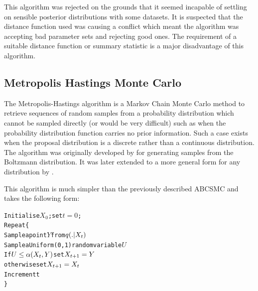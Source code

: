 
This algorithm was rejected on the grounds that it seemed incapable of settling on sensible posterior distributions with some datasets. It is suspected that the distance function used was causing a conflict which meant the algorithm was accepting bad parameter sets and rejecting good ones. The requirement of a suitable distance function or summary statistic is a major disadvantage of this algorithm.

\subsection{Metropolis Hastings Monte Carlo}
The Metropolis-Hastings algorithm is a Markov Chain Monte Carlo method to retrieve sequences of random samples from a probability distribution which cannot be sampled directly (or would be very difficult) such as when the probability distribution function carries no prior information. Such a case exists when the proposal distribution is a discrete rather than a continuous distribution. The algorithm was originally developed by \citet{Metropolis1953} for generating samples from the Boltzmann distribution. It was later extended to a more general form for any distribution by \citet{Hastings1970}.

This algorithm is much simpler than the previously described ABCSMC and takes the following form\cite{Gilks1996}:

\singlespacing %
\begin{alltt}
Initialise \(X_0\); set \(t=0\);
Repeat \{
  Sample a point \(Y\) from \(q(.|X\sb{t})\)
  Sample a Uniform(0,1) random variable \(U\)
  If \(U \leq \alpha(X\sb{t},Y)\) set \(X\sb{t+1}=Y\)
    otherwise set \(X\sb{t+1}=X_t\)
  Increment t
\}
\end{alltt}
\doublespacing %

